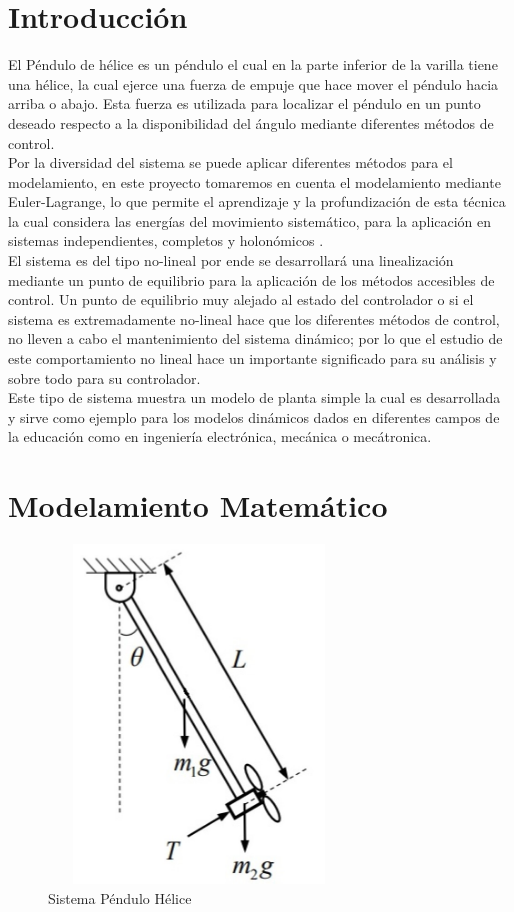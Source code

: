 \documentclass[12pt]{article}
\begin{document}
\newpage
\section{Introducción}

El Péndulo de hélice es un péndulo el cual en la parte inferior de la varilla tiene una hélice, la cual ejerce una fuerza de empuje que hace mover el péndulo hacia arriba o abajo. Esta fuerza es utilizada para localizar el péndulo en un punto deseado respecto a la disponibilidad del ángulo mediante diferentes métodos de control. 
\\
Por la diversidad del sistema se puede aplicar diferentes métodos para el modelamiento, en este proyecto tomaremos en cuenta el modelamiento mediante Euler-Lagrange, lo que permite el aprendizaje y la profundización de esta técnica la cual considera las energías del movimiento sistemático, para la aplicación en sistemas independientes, completos y holonómicos \cite{MitLagrange}.
\\
El sistema es del tipo no-lineal por ende se desarrollará una linealización mediante un punto de equilibrio para la aplicación de los métodos accesibles de control. Un punto de equilibrio muy alejado al estado del controlador o si el sistema es extremadamente no-lineal hace que los diferentes métodos de control, no lleven a cabo el mantenimiento del sistema dinámico; por lo que el estudio de este comportamiento no lineal hace un importante significado para su análisis y sobre todo para su controlador. 
\\
Este tipo de sistema muestra un modelo de planta simple la cual es desarrollada y sirve como ejemplo para los modelos dinámicos dados en diferentes campos de la educación como en ingeniería electrónica, mecánica o mecátronica.
\newpage
\section{Modelamiento Matemático}

\begin{figure}[h]
    \centering
    \includegraphics[width=8cm, height=9cm]{model.jpg}
    \caption{Sistema Péndulo Hélice}
    \label{fig:model}
\end{figure}
\end{document}

